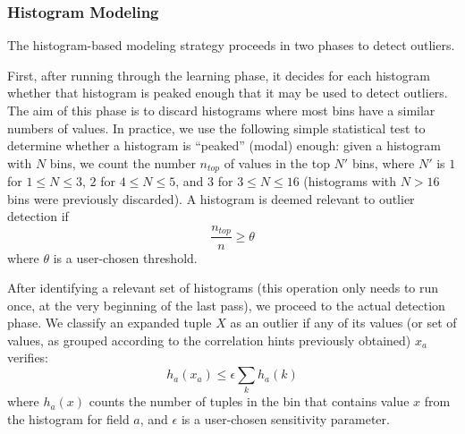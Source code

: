 \subsubsection{Histogram Modeling}
The histogram-based modeling strategy proceeds in two phases to detect outliers. 

First, after running through the learning phase, it decides for each histogram whether that histogram is peaked enough that it may be used to detect outliers. The aim of this phase is to discard histograms where most bins have a similar numbers of values. In practice, we use the following simple statistical test to determine whether a histogram is ``peaked'' (modal) enough: given a histogram with $N$ bins, we count the number $n_{top}$ of values in the top $N'$ bins, where $N'$ is $1$ for $1 \leq N \leq 3$, $2$ for $4 \leq N \leq 5$, and $3$ for $3 \leq N \leq 16$ (histograms with $N > 16$ bins were previously discarded). A histogram is deemed relevant to outlier detection if
\begin{equation}
 \frac{n_{top}}{n} \geq \theta 
\end{equation}
where $\theta$ is a user-chosen threshold. 

After identifying a relevant set of histograms (this operation only needs to run once, at the very beginning of the last pass), we proceed to the actual detection phase. We classify an expanded tuple $X$ as an outlier if any of its values (or set of values, as grouped according to the correlation hints previously obtained) $x_a$ verifies:
\begin{equation}
h_a(x_a) \le \epsilon \sum_k h_a(k)
\end{equation}
where $h_a(x)$ counts the number of tuples in the bin that contains value $x$ from the histogram for field $a$, and $\epsilon$ is a user-chosen sensitivity parameter.
